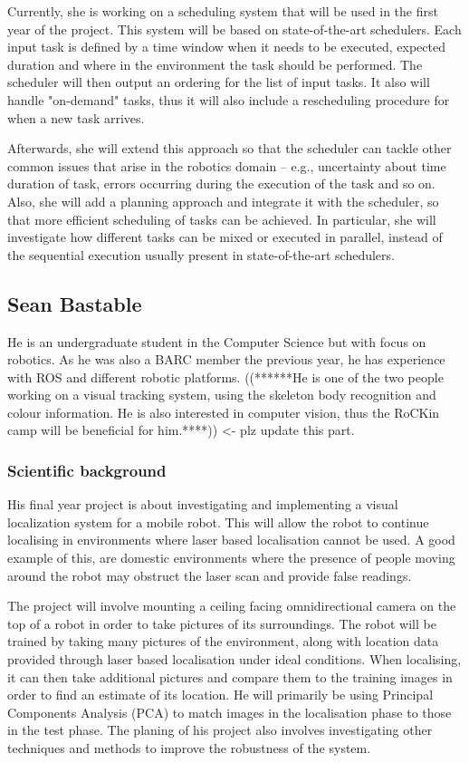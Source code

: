 \documentclass[conference]{IEEEtran}
\begin{document}
Currently, she is working on a scheduling system that will be used in the first year of the project. This system will be based on state-of-the-art schedulers. Each input task is defined by a time window when it needs to be executed, expected duration and where in the environment the task should be performed. The scheduler will then output an ordering for the list of input tasks. It also will handle "on-demand" tasks, thus it will also include a rescheduling procedure for when a new task arrives.

Afterwards, she will extend this approach so that the scheduler can tackle other common issues that arise in the robotics domain – e.g., uncertainty about time duration of task, errors occurring during the execution of the task and so on. Also, she will add a planning approach and integrate it with the scheduler, so that more efficient scheduling of tasks can be achieved. In particular, she will investigate how different tasks can be mixed or executed in parallel, instead of the sequential execution usually present in state-of-the-art schedulers.

\subsection{Sean Bastable}

He is an undergraduate student in the Computer Science but with focus on robotics. As he was also a BARC member the previous year, he has experience with ROS and different robotic platforms. ((******He is one of the two people working on a visual tracking system, using the skeleton body recognition and colour information. He is also interested in computer vision, thus the RoCKin camp will be beneficial for him.****)) <- plz update this part.

\subsubsection*{Scientific background}
 
 His final year project is about investigating and implementing a visual localization system for a mobile robot. This will allow the robot to continue localising in environments where laser based localisation cannot be used. A good example of this, are domestic environments where the presence of people moving around the robot may obstruct the laser scan and provide false readings.
 
The project will involve mounting a ceiling facing omnidirectional camera on the top of a robot in order to take pictures of its surroundings.
The robot will be trained by taking many pictures of the environment, along with location data provided through laser based localisation under ideal conditions. When localising, it can then take additional pictures and compare them to the training images in order to find an estimate of its location. He will primarily be using Principal Components Analysis (PCA) to match images in the localisation phase to those in the test phase. The planing of his project also involves investigating other techniques and methods to improve the robustness of the system.
\end{document}

